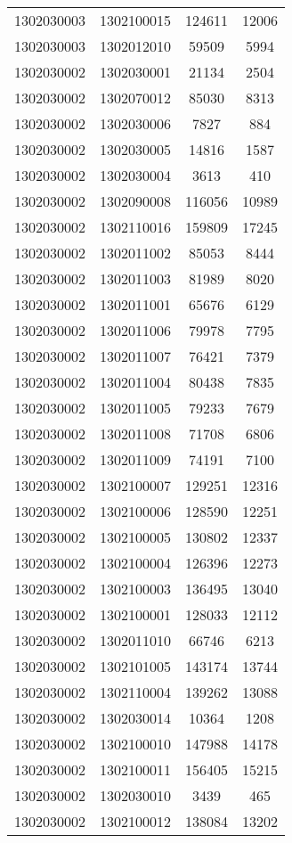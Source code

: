 \begin{longtable}[h]{llcc}
		1302030003 & 1302100015 & 124611 & 12006\\
		1302030003 & 1302012010 & 59509 & 5994\\
		1302030002 & 1302030001 & 21134 & 2504\\
		1302030002 & 1302070012 & 85030 & 8313\\
		1302030002 & 1302030006 & 7827 & 884\\
		1302030002 & 1302030005 & 14816 & 1587\\
		1302030002 & 1302030004 & 3613 & 410\\
		1302030002 & 1302090008 & 116056 & 10989\\
		1302030002 & 1302110016 & 159809 & 17245\\
		1302030002 & 1302011002 & 85053 & 8444\\
		1302030002 & 1302011003 & 81989 & 8020\\
		1302030002 & 1302011001 & 65676 & 6129\\
		1302030002 & 1302011006 & 79978 & 7795\\
		1302030002 & 1302011007 & 76421 & 7379\\
		1302030002 & 1302011004 & 80438 & 7835\\
		1302030002 & 1302011005 & 79233 & 7679\\
		1302030002 & 1302011008 & 71708 & 6806\\
		1302030002 & 1302011009 & 74191 & 7100\\
		1302030002 & 1302100007 & 129251 & 12316\\
		1302030002 & 1302100006 & 128590 & 12251\\
		1302030002 & 1302100005 & 130802 & 12337\\
		1302030002 & 1302100004 & 126396 & 12273\\
		1302030002 & 1302100003 & 136495 & 13040\\
		1302030002 & 1302100001 & 128033 & 12112\\
		1302030002 & 1302011010 & 66746 & 6213\\
		1302030002 & 1302101005 & 143174 & 13744\\
		1302030002 & 1302110004 & 139262 & 13088\\
		1302030002 & 1302030014 & 10364 & 1208\\
		1302030002 & 1302100010 & 147988 & 14178\\
		1302030002 & 1302100011 & 156405 & 15215\\
		1302030002 & 1302030010 & 3439 & 465\\
		1302030002 & 1302100012 & 138084 & 13202\\

\end{longtable}
